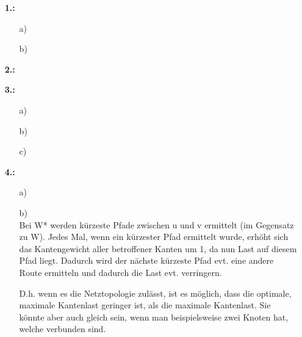 \documentclass[a4paper,11pt,fleqn]{scrartcl}
\title{\titleinfo}
\author{\authorinfo}
\begin{document}
	\maketitle
	\begin{enumerate}
		\item[\textbf{1.:}]
		\begin{enumerate}
			\item[a)] \quad \\
			\todo
			\item[b)] \quad \\
			\todo
		\end{enumerate}
		\item[\textbf{2.:}] \quad \\
		\todo
		\item[\textbf{3.:}]
		\begin{enumerate}
			\item[a)] \quad \\
			\todo
			\item[b)] \quad \\
			\todo
			\item[c)] \quad \\
			\todo
		\end{enumerate}
		\item[\textbf{4.:}]
		\begin{enumerate}
			\item[a)] \quad \\
			\todo
			\item[b)] \quad \\
			Bei W* werden kürzeste Pfade zwischen u und v ermittelt (im Gegensatz zu W). Jedes Mal, wenn ein kürzester Pfad ermittelt wurde, erhöht sich das Kantengewicht aller betroffener Kanten um 1, da nun Last auf diesem Pfad liegt. Dadurch wird der nächste kürzeste Pfad evt. eine andere Route ermitteln und dadurch die Last evt. verringern.

D.h. wenn es die Netztopologie zulässt, ist es möglich, dass die optimale, maximale Kantenlast geringer ist, als die maximale Kantenlast. Sie könnte aber auch gleich sein, wenn man beispielsweise zwei Knoten hat, welche verbunden sind.
		\end{enumerate}
	\end{enumerate}
\end{document}
